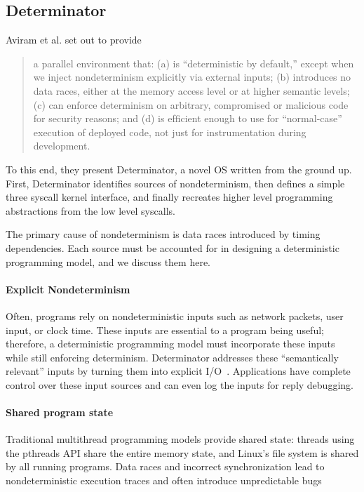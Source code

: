 \subsection{Determinator}

Aviram et al. set out to provide
\begin{quote}
a parallel environment that:
(a) is ``deterministic by default,'' except when
we inject nondeterminism explicitly via external inputs;
(b) introduces no data races, either at the memory access level
or at higher semantic levels; (c)
can enforce determinism on arbitrary, compromised or
malicious code for security reasons; and (d) is efﬁcient
enough to use for ``normal-case'' execution of deployed
code, not just for instrumentation during development. \cite{Aviram10}
\end{quote}

To this end, they present Determinator, a novel OS written from the ground up.
First, Determinator identifies sources of nondeterminism, then defines a simple
three syscall kernel interface, and finally recreates higher level programming
abstractions from the low level syscalls.

The primary cause of nondeterminism is data races introduced by timing
dependencies. Each source must be accounted for in designing a deterministic
programming model, and we discuss them here.

\paragraph{Explicit Nondeterminism}
Often, programs rely on nondeterministic inputs such as network packets, user
input, or clock time. These inputs are essential to a program being useful;
therefore, a deterministic programming model must incorporate these inputs while
still enforcing determinism. Determinator addresses these ``semantically
relevant'' inputs by turning them into explicit I/O~\cite{Aviram10}.
Applications have complete control over these input sources and can even log the
inputs for reply debugging.

\paragraph{Shared program state}
Traditional multithread programming models provide shared state: threads using
the pthreads API share the entire memory state, and Linux's file system is
shared by all running programs. Data races and incorrect synchronization lead
to nondeterministic execution traces and often introduce unpredictable bugs

